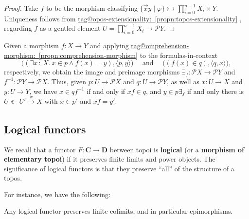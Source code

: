 \documentclass{amsart}
\makeatletter
\newcommand\AND{\text{ and }}
\newcommand\bC{\mathbf{C}}
\newcommand\bD{\mathbf{D}}
\newcommand\br[1]{\langle{}#1\rangle{}}
\newcommand\defword[1]{{\boldmath \textbf{#1}}}
\newcommand\I{^{-1}}
\newcommand\oot{\twoheadleftarrow}
\newcommand\pbig[1]{\big({#1}\big)}
\renewcommand\phi{\varphi}
\newcommand\pow{\mathcal{P}}
\newcommand\set[2][]{#1\{ #2 #1\}}
\newcommand\tolon{{\,:\,}}
\newcommand\ToT{\Leftrightarrow}
\newcommand\tox[2][]{\xrightarrow[#1]{#2}}
\newcommand\tto{\rightarrowtail}
\newcommand\vek[1]{{\vec{#1}}}
\newcommand\vx{\vek{x}}
\newcommand\vX{\vek{X}}
\newcommand\xot[2][]{\xleftarrow[#1]{#2}}
\newcommand\tagword[1]{\csname tag@#1\endcsname}
\def\label@tag#1:#2\@nil{#1}
\newcommand\labeltag[1]{\label@tag#1:\@nil}
\newcommand\jref[1]{%
  \texorpdfstring%
    {\hyperref[#1]{\tagword{\labeltag{#1}}~\ref*{#1}}}%
    {\tagword{\labeltag{#1}}~\ref*{#1}}%
}
\theoremstyle{definition}
\theoremstyle{remark}
\theoremstyle{plainwithref}
\makeatother
\begin{document}
\begin{proof}
  Take \( f \) to be the morphism classifying \( \set{\vx y \mid \phi} \tto \prod_{i=0}^{n-1} X_i \times Y \).
  Uniqueness follows from \jref{propn:topos-extensionality}, regarding \( f \) as a gentled element \( U = \prod_{i=0}^{n-1} X_i \to \pow Y \).
\end{proof}

\begin{exm} \label{exm:im-preim-by-comp}
  Given a morphism \( f \colon X \to Y \) and applying \jref{propn:comprehension-morphism} to the formulas-in-context
  \[
    \pbig{(\exists x \tolon X.\ x \in p \wedge f(x) = y), \br{p, y}}
    \quad\AND\quad
    \pbig{(f(x) \in q), \br{q, x}},
  \]
  respectively, we obtain the image and preimage morphisms \( \exists_f \colon \pow X \to \pow Y \) and \( f\I \colon \pow Y \to \pow X \).
  Thus, given \( p \colon U \to \pow X \) and \( q \colon U \to \pow Y \), as well as \( x \colon U \to X \) and \( y \colon U \to Y \), we have \( x \in q f\I \) if and only if \( x f \in q \), and \( y \in p \exists_f \) if and only there is \( U \oot U' \tox{x} X \) with \( x \in p' \) and \( x f = y' \).
\end{exm}

\subsection{Logical functors} \label{subsec:logical-functors}
We recall that a functor \( F \colon \bC \to \bD \) between topoi is \defword{logical} (or a \defword{morphism of elementary topoi}) if it preserves finite limits and power objects.
The significance of logical functors is that they preserve ``all'' of the structure of a topos.

For instance, we have the following:
\begin{propn} \label{propn:logical-fun-pres-colimits}
  Any logical functor preserves finite colimits, and in particular epimorphisms.
\end{propn}
\end{document}
